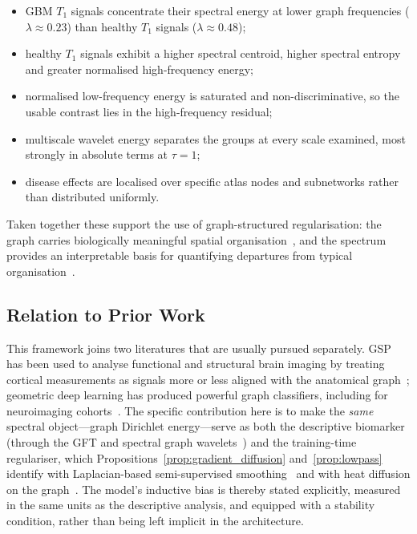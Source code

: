 \documentclass[11pt,reqno]{amsart}
\theoremstyle{plain}
\theoremstyle{definition}
\theoremstyle{remark}
\numberwithin{equation}{section}
\begin{document}
\begin{itemize}[leftmargin=1.6em]
  \item GBM $T_1$ signals concentrate their spectral energy at lower graph
        frequencies ($\lambda\approx0.23$) than healthy $T_1$ signals
        ($\lambda\approx0.48$);
  \item healthy $T_1$ signals exhibit a higher spectral centroid, higher
        spectral entropy and greater normalised high-frequency energy;
  \item normalised low-frequency energy is saturated and non-discriminative,
        so the usable contrast lies in the high-frequency residual;
  \item multiscale wavelet energy separates the groups at every scale examined,
        most strongly in absolute terms at $\tau=1$;
  \item disease effects are localised over specific atlas nodes and subnetworks
        rather than distributed uniformly.
\end{itemize}

Taken together these support the use of graph-structured regularisation: the
graph carries biologically meaningful spatial
organisation~\cite{bullmore2009complex,bassett2017network}, and the spectrum
provides an interpretable basis for quantifying departures from typical
organisation~\cite{huang2018graph,medaglia2018functional,preti2019decoupling}.

\subsection{Relation to Prior Work}

This framework joins two literatures that are usually pursued separately. GSP has
been used to analyse functional and structural brain imaging by treating cortical
measurements as signals more or less aligned with the anatomical
graph~\cite{huang2018graph,huang2016graph,medaglia2018functional,
atasoy2016human,preti2019decoupling}; geometric deep learning has produced
powerful graph classifiers, including for neuroimaging
cohorts~\cite{bronstein2017geometric,kipf2017semi,defferrard2016convolutional,
gilmer2017neural,parisot2018disease,ktena2018metric,li2021braingnn}. The specific
contribution here is to make the \emph{same} spectral object---graph Dirichlet
energy---serve as both the descriptive biomarker (through the GFT and spectral
graph wavelets~\cite{shuman2013emerging,hammond2011wavelets}) and the
training-time regulariser, which Propositions~\ref{prop:gradient_diffusion}
and~\ref{prop:lowpass} identify with Laplacian-based semi-supervised
smoothing~\cite{zhou2004learning,belkin2003laplacian} and with heat diffusion on
the graph~\cite{coifman2006diffusion}. The model's inductive bias is thereby
stated explicitly, measured in the same units as the descriptive analysis, and
equipped with a stability condition, rather than being left implicit in the
architecture.
\end{document}
